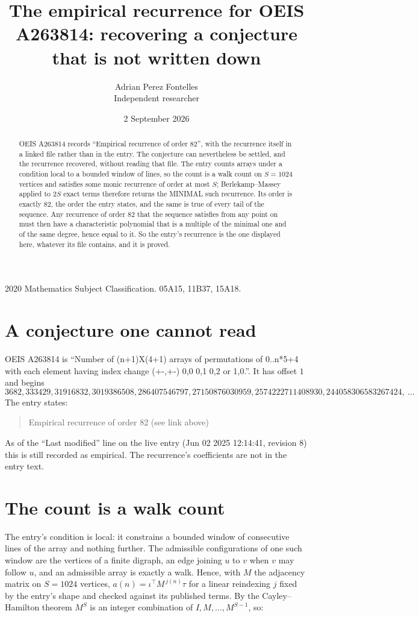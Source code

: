 \documentclass[11pt,a4paper]{article}
\title{The empirical recurrence for OEIS A263814: recovering a conjecture that is not written down}
\author{Adrian Perez Fontelles\\ \small Independent researcher}
\date{2 September 2026}
\theoremstyle{plain}
\theoremstyle{definition}
\begin{document}
\maketitle

\begin{abstract}
OEIS A263814 records ``Empirical recurrence of order $82$'', with the recurrence itself in a
linked file rather than in the entry. The conjecture can nevertheless be settled, and the
recurrence recovered, without reading that file. The entry counts arrays under a condition
local to a bounded window of lines, so the count is a walk count on $S=1024$ vertices and
satisfies some monic recurrence of order at most $S$; Berlekamp--Massey applied to $2S$ exact
terms therefore returns the MINIMAL such recurrence. Its order is exactly $82$, the order
the entry states, and the same is true of every tail of the sequence. Any recurrence of order
$82$ that the sequence satisfies from any point on must then have a characteristic
polynomial that is a multiple of the minimal one and of the same degree, hence equal to it. So
the entry's recurrence is the one displayed here, whatever its file contains, and it is
proved.
\end{abstract}

\noindent\small 2020 Mathematics Subject Classification. 05A15, 11B37, 15A18.\normalsize

\section{A conjecture one cannot read}

OEIS A263814 is ``Number of (n+1)X(4+1) arrays of permutations of 0..n*5+4 with each element having index change (+-,+-) 0,0 0,1 0,2 or 1,0.''. It has offset $1$ and begins
\[
3682, 333429, 31916832, 3019386508, 286407546797, 27150876030959, 2574222711408930, 244058306583267424,\ \dots
\]
The entry states:
\begin{quote}
Empirical recurrence of order 82 (see link above)
\end{quote}
As of the ``Last modified'' line on the live entry (Jun 02 2025 12:14:41, revision 8) this is still
recorded as empirical. The recurrence's coefficients are not in the entry text.

\section{The count is a walk count}

The entry's condition is local: it constrains a bounded window of consecutive lines of the
array and nothing further. The admissible configurations of one such window are the vertices
of a finite digraph, an edge joining $u$ to $v$ when $v$ may follow $u$, and an admissible
array is exactly a walk. Hence, with $M$ the adjacency matrix on $S=1024$ vertices,
$a(n)=\iota^{\!\top}M^{\,j(n)}\tau$ for a linear reindexing $j$ fixed by the entry's shape
and checked against its published terms. By the Cayley--Hamilton theorem $M^{S}$ is an
integer combination of $I,M,\dots,M^{S-1}$, so:
\end{document}
